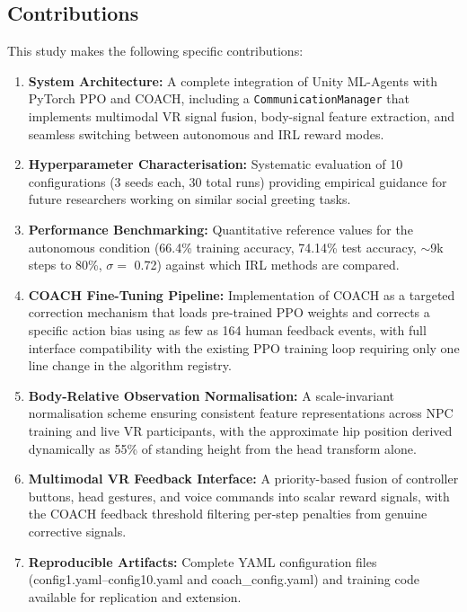 \documentclass[../report.tex]{subfiles}
\begin{document}
    \subsection{Contributions}
    \label{sec:conclusions:contributions}

    This study makes the following specific contributions:

    \begin{enumerate}
        \item \textbf{System Architecture:} A complete integration of Unity ML-Agents with PyTorch PPO and COACH, including a \texttt{CommunicationManager} that implements multimodal VR signal fusion, body-signal feature extraction, and seamless switching between autonomous and IRL reward modes.

        \item \textbf{Hyperparameter Characterisation:} Systematic evaluation of 10 configurations (3 seeds each, 30 total runs) providing empirical guidance for future researchers working on similar social greeting tasks.

        \item \textbf{Performance Benchmarking:} Quantitative reference values for the autonomous condition (66.4\% training accuracy, 74.14\% test accuracy, $\sim$9k steps to 80\%, $\sigma = $ 0.72) against which IRL methods are compared.

        \item \textbf{COACH Fine-Tuning Pipeline:} Implementation of COACH as a targeted correction mechanism that loads pre-trained PPO weights and corrects a specific action bias using as few as 164 human feedback events, with full interface compatibility with the existing PPO training loop requiring only one line change in the algorithm registry.

        \item \textbf{Body-Relative Observation Normalisation:} A scale-invariant normalisation scheme ensuring consistent feature representations across NPC training and live VR participants, with the approximate hip position derived dynamically as 55\% of standing height from the head transform alone.

        \item \textbf{Multimodal VR Feedback Interface:} A priority-based fusion of controller buttons, head gestures, and voice commands into scalar reward signals, with the COACH feedback threshold filtering per-step penalties from genuine corrective signals.

        \item \textbf{Reproducible Artifacts:} Complete YAML configuration files (config1.yaml--config10.yaml and coach\_config.yaml) and training code available for replication and extension.
    \end{enumerate}
\end{document}
